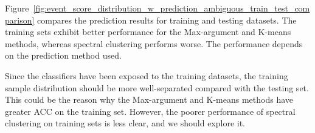 \documentclass[12pt]{article}
\begin{document}
        Figure~\ref{fig:event_score_distribution_w_prediction_ambiguous_train_test_comparison} compares the prediction results for training and testing datasets. The training sets exhibit better performance for the Max-argument and K-means methods, whereas spectral clustering performs worse. The performance depends on the prediction method used.  

        Since the classifiers have been exposed to the training datasets, the training sample distribution should be more well-separated compared with the testing set. This could be the reason why the Max-argument and K-means methods have greater ACC on the training set. However, the poorer performance of spectral clustering on training sets is less clear, and we should explore it.
        \begin{figure}[htpb]
            \centering
             \\  
\end{figure}
\end{document}
